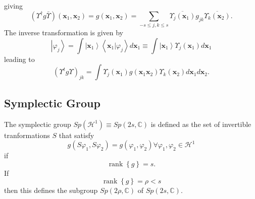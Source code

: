 \documentclass[aps,preprint]{revtex4}%
\begin{document}
giving
\begin{equation}
\left(  \Upsilon^{\dagger}g\bar{\Upsilon}\right)  \left(  \mathbf{x}%
_{1},\mathbf{x}_{2}\right)  =g\left(  \mathbf{x}_{1},\mathbf{x}_{2}\right)
=\sum_{-s\leq j,k\leq s}\overline{\Upsilon_{j}\left(  \mathbf{x}_{1}\right)
}g_{jk}\overline{\Upsilon_{k}\left(  \mathbf{x}_{2}\right)  }.
\end{equation}
The inverse transformation is given by%
\begin{equation}
\left\vert \varphi_{j}\right\rangle =\int\left\vert \mathbf{x}_{1}%
\right\rangle \left\langle \left.  \mathbf{x}_{1}\right\vert \varphi
_{j}\right\rangle d\mathbf{x}_{1}\equiv\int\left\vert \mathbf{x}%
_{1}\right\rangle \Upsilon_{j}\left(  \mathbf{x}_{1}\right)  d\mathbf{x}_{1}%
\end{equation}
leading to%
\begin{equation}
\left(  \Upsilon^{t}g\Upsilon\right)  _{jk}=\int\Upsilon_{j}\left(
\mathbf{x}_{1}\right)  g\left(  \mathbf{x}_{1}\mathbf{x}_{2}\right)
\Upsilon_{k}\left(  \mathbf{x}_{2}\right)  d\mathbf{x}_{1}d\mathbf{x}_{2}.
\end{equation}


\subsection{Symplectic Group}

The symplectic group $Sp\left(  \mathcal{H}^{1}\right)  \equiv Sp\left(
2s,\mathbb{C}\right)  $ is defined as the set of invertible tranformations $S$
that satisfy
\begin{equation}
g\left(  S\varphi_{1},S\varphi_{2}\right)  =g\left(  \varphi_{1},\varphi
_{2}\right)  \forall\varphi_{1},\varphi_{2}\in\mathcal{H}^{1}%
\end{equation}
if
\begin{equation}
\operatorname*{rank}\left\{  g\right\}  =s.
\end{equation}
If
\begin{equation}
\operatorname*{rank}\left\{  g\right\}  =\rho<s
\end{equation}
then this defines the subgroup $Sp\left(  2\rho,\mathbb{C}\right)  $ of
$Sp\left(  2s,\mathbb{C}\right)  .$
\end{document}
